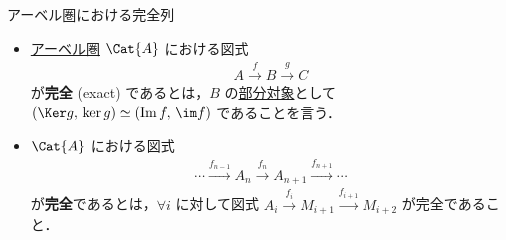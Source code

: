 \documentclass[algtopo_main]{subfiles}
\begin{document}
\begin{mydef}[label=def:Ab-ES]{アーベル圏における完全列}
    \begin{itemize}
        \item \hyperref[def:Abel]{アーベル圏} $\Cat{A}$ における図式
        \begin{align}
            A \xrightarrow{f} B \xrightarrow{g} C
        \end{align}
        が\textbf{完全} (exact) であるとは，$B$ の\hyperref[def:sub]{部分対象}として $(\Ker g,\, \ker g) \simeq (\Im f,\, \im f)$ であることを言う．
        \item $\Cat{A}$ における図式
        \begin{align}
            \cdots \xrightarrow{f_{n-1}} A_{n} \xrightarrow{f_{n}} A_{n+1} \xrightarrow{f_{n+1}} \cdots
        \end{align}
        が\textbf{完全}であるとは，$\forall i$ に対して図式 $A_i \xrightarrow{f_i} M_{i+1} \xrightarrow{f_{i+1}} M_{i+2}$ が完全であること．
    \end{itemize}
\end{mydef}
\end{document}
